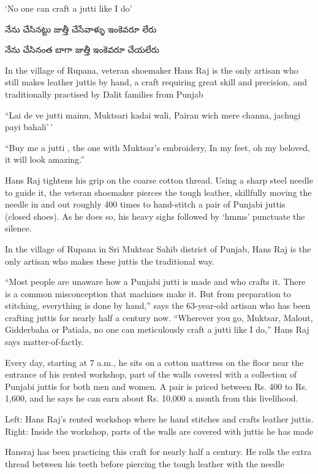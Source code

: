 \documentclass[
]{interact}
\author{}
\begin{document}
\captionsetup{labelsep=space}


`No one can craft a jutti like I do'

నేను చేసినట్టు జుత్తీ చేసేవాళ్ళు ఇంకెవరూ లేరు

నేను చేసినంత బాగా జుత్తీ ఇంకెవరూ చేయలేరు

In the village of Rupana, veteran shoemaker Hans Raj is the only artisan
who still makes leather juttis by hand, a craft requiring great skill
and precision, and traditionally practised by Dalit families from Punjab

``Lai de ve jutti mainu, Muktsari kadai wali, Pairan wich mere channa,
jachugi payi bahali'\,'

``Buy me a jutti , the one with Muktsar's embroidery, In my feet, oh my
beloved, it will look amazing.''

Hans Raj tightens his grip on the coarse cotton thread. Using a sharp
steel needle to guide it, the veteran shoemaker pierces the tough
leather, skillfully moving the needle in and out roughly 400 times to
hand-stitch a pair of Punjabi juttis (closed shoes). As he does so, his
heavy sighs followed by `hmms' punctuate the silence.

In the village of Rupana in Sri Muktsar Sahib district of Punjab, Hans
Raj is the only artisan who makes these juttis the traditional way.

``Most people are unaware how a Punjabi jutti is made and who crafts it.
There is a common misconception that machines make it. But from
preparation to stitching, everything is done by hand,'' says the
63-year-old artisan who has been crafting juttis for nearly half a
century now. ``Wherever you go, Muktsar, Malout, Gidderbaha or Patiala,
no one can meticulously craft a jutti like I do,'' Hans Raj says
matter-of-factly.

Every day, starting at 7 a.m., he sits on a cotton mattress on the floor
near the entrance of his rented workshop, part of the walls covered with
a collection of Punjabi juttis for both men and women. A pair is priced
between Rs. 400 to Rs. 1,600, and he says he can earn about Rs. 10,000 a
month from this livelihood.

Left: Hans Raj's rented workshop where he hand stitches and crafts
leather juttis. Right: Inside the workshop, parts of the walls are
covered with juttis he has made

Hansraj has been practicing this craft for nearly half a century. He
rolls the extra thread between his teeth before piercing the tough
leather with the needle
\end{document}

